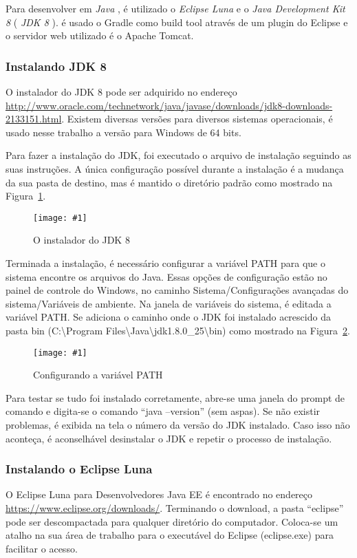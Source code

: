 \documentclass[a4paper,12pt]{article}
\newcommand{\figura}[3] {
	\begin{figure}[ht]
		\centering
		\texttt{[image: \#1]}
		\caption{#2}
		\label{#3}
	\end{figure}
	\FloatBarrier
}
\newcommand{\est}[1] {
	\textit{#1}
}
\newcommand{\sigla}[1] {
	\textit{#1}
}
\newcommand{\lang}[1] {
	\textit{#1}
}
\begin{document}
Para desenvolver em \lang{Java}, é utilizado o  \est{Eclipse Luna} e o \est{Java Development Kit 8} (\sigla{JDK 8}). é usado o Gradle como build tool através de um plugin do Eclipse e o servidor web utilizado é o Apache Tomcat.

\subsubsection{Instalando JDK 8}

O instalador do JDK 8 pode ser adquirido no endereço \url{http://www.oracle.com/technetwork/java/javase/downloads/jdk8-downloads-2133151.html}. Existem diversas versões para diversos sistemas operacionais, é usado nesse trabalho a versão para Windows de 64 bits. 

Para fazer a instalação do JDK, foi executado o arquivo de instalação seguindo  as suas instruções. A única configuração possível durante a instalação é a mudança da sua pasta de destino, mas é mantido o diretório padrão como mostrado na Figura~\ref{fig:jdk1}.

\figura{jdk81.jpg}{O instalador do JDK 8}{fig:jdk1}

Terminada a instalação, é necessário configurar a variável PATH para que o sistema encontre os arquivos do Java. Essas opções de configuração estão no painel de controle do Windows, no caminho Sistema/Configurações avançadas do sistema/Variáveis de ambiente. Na janela de variáveis do sistema, é editada a variável PATH. Se adiciona o caminho onde o JDK foi instalado acrescido da pasta bin (C:\textbackslash Program Files\textbackslash Java\textbackslash jdk\textmd{1.8.0\_25}\textbackslash bin) como mostrado na Figura~\ref{fig:path}.

\figura{path1.png}{Configurando a variável PATH}{fig:path}

Para testar se tudo foi instalado corretamente, abre-se uma janela do prompt de comando e digita-se o comando “java –version” (sem aspas). Se não existir problemas, é exibida na tela o número da versão do JDK instalado. Caso isso não aconteça, é aconselhável desinstalar o JDK e repetir o processo de instalação. 

\subsubsection{Instalando o Eclipse Luna} 

O Eclipse Luna para Desenvolvedores Java EE é encontrado no endereço \url{https://www.eclipse.org/downloads/}. Terminando o download, a pasta “eclipse” pode ser descompactada para qualquer diretório do computador. Coloca-se um atalho na sua área de trabalho para o executável do Eclipse (eclipse.exe) para facilitar o acesso.
\end{document}
